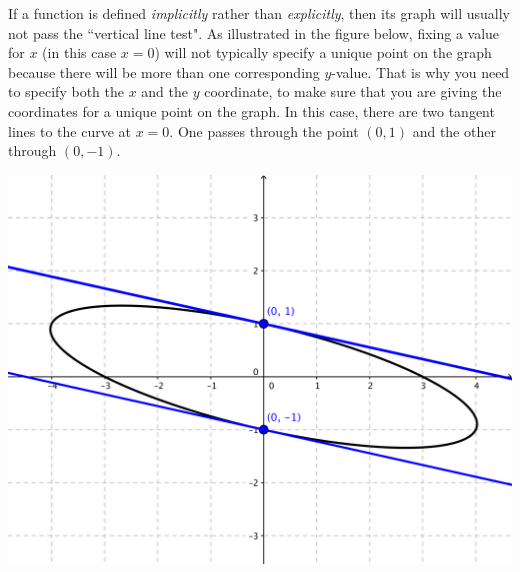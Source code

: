 \documentclass[nooutcomes]{ximera}
\begin{document}
\begin{problem}
	\begin{freeResponse}
		If a function is defined \emph{implicitly} rather than \emph{explicitly}, then its graph will usually not pass the ``vertical line test".  As illustrated in the figure below, fixing a value for $x$ (in this case $x=0$) will not typically specify a unique point on the graph because there will be more than one corresponding $y$-value.  That is why you need to specify both the $x$ and the $y$ coordinate, to make sure that you are giving the coordinates for a unique point on the graph.  In this case, there are two tangent lines to the curve at $x=0$.  One passes through the point $(0,1)$ and the other through $(0,-1)$.
	\begin{image}
\includegraphics[scale=.5]{figure2.png}
\end{image}		


	\end{freeResponse}	
\end{problem}
\end{document}
